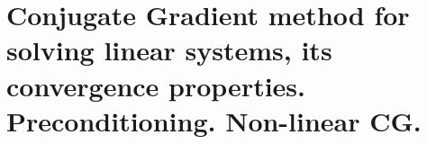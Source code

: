 \chapter{Conjugate Gradient method for solving linear systems, its convergence properties. Preconditioning. Non-linear CG.}
